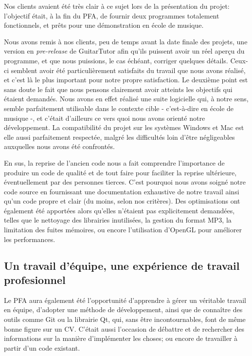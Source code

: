 \documentclass[a4paper,11pt]{article}
\begin{document}
Nos clients avaient été très clair à ce sujet lors de la présentation du projet: l'objectif était, à la fin du PFA, de fournir deux programmes totalement fonctionnels, et prêts pour une démonstration en école de musique.

Nous avons remis à nos clients, peu de temps avant la date finale des projets, une version en \textit{pre-release} de GuitarTutor afin qu'ils puissent avoir un réel aperçu du programme, et que nous puissions, le cas échéant, corriger quelques détails. Ceux-ci semblent avoir été particulièrement satisfaits du travail que nous avons réalisé, et c'est là le plus important pour notre propre satisfaction. Le deuxième point est sans doute le fait que nous pensons clairement avoir atteints les objectifs qui étaient demandés. Nous avons en effet réalisé une suite logicielle qui, à notre sens, semble parfaitement utilisable dans le contexte cible - c'est-à-dire en école de musique -, et c'était d'ailleurs ce vers quoi nous avons orienté notre développement. La compatibilité du projet sur les systèmes Windows et Mac est elle aussi parfaitement respectée, malgré les difficultés loin d'être négligeables auxquelles nous avons été confrontés.

En sus, la reprise de l'ancien code nous a fait comprendre l'importance de produire un code de qualité et de tout faire pour faciliter la reprise ultérieure, éventuellement par des personnes tierces. C'est pourquoi nous avons soigné notre code source en fournissant une documentation exhaustive de notre travail ainsi qu'un code propre et clair (du moins, selon nos critères). Des optimisations ont également été apportées alors qu'elles n'étaient pas explicitement demandées, telles que le nettoyage des librairies inutilisées, la gestion du format MP3, la limitation des fuites mémoires, ou encore l'utilisation d'OpenGL pour améliorer les performances.

\subsection*{Un travail d'équipe, une expérience de travail profesionnel}

Le PFA aura également été l'opportunité d'apprendre à gérer un véritable travail en équipe, d'adopter une méthode de développement, ainsi que de connaître des outils comme Git ou la librairie Qt, qui, sans être incontournables, font de même bonne figure sur un CV. C'était aussi l'occasion de débattre et de rechercher des informations sur la manière d'implémenter les choses; ou encore de travailler à partir d'un code existant.
\end{document}
